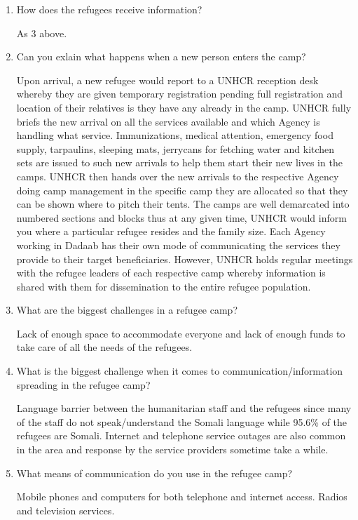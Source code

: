 \begin{enumerate}
\item How does the refugees receive information?

As 3 above.

\item Can you exlain what happens when a new person enters the camp?

Upon arrival, a new refugee would report to a UNHCR reception desk whereby they are given temporary registration pending full registration and location of their relatives is they have any already in the camp. UNHCR fully briefs the new arrival on all the services available and which Agency is handling what service. Immunizations, medical attention, emergency food supply, tarpaulins, sleeping mats, jerrycans for fetching water and kitchen sets are issued to such new arrivals to help them start their new lives in the camps. UNHCR then hands over the new arrivals to the respective Agency doing camp management in the specific camp they are allocated so that they can be shown where to pitch their tents. The camps are well demarcated into numbered sections and blocks thus at any given time, UNHCR would inform you where a particular refugee resides and the family size. Each Agency working in Dadaab has their own mode of communicating the services they provide to their target beneficiaries. However, UNHCR holds regular meetings with the refugee leaders of each respective camp whereby information is shared with them for dissemination to the entire refugee population.


\item What are the biggest challenges in a refugee camp?

Lack of enough space to accommodate everyone and lack of enough funds to take care of all the needs of the refugees.


\item What is the biggest challenge when it comes to communication/information spreading in the refugee camp?

Language barrier between the humanitarian staff and the refugees since many of the staff do not speak/understand the Somali language while 95.6\% of the refugees are Somali. Internet and telephone service outages are also common in the area and response by the service providers sometime take a while.


\item What means of communication do you use in the refugee camp?

Mobile phones and computers for both telephone and internet access. Radios and television services.


\end{enumerate}
